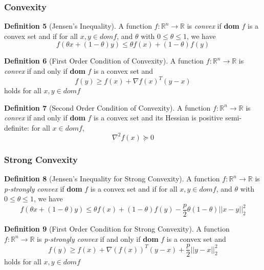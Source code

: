 \subsubsection{Convexity}
\noindent \textbf{Definition 5} (Jensen's Inequality). A function $f: \mathbb{R}^n \rightarrow \mathbb{R}$ is \textit{convex} if \textbf{dom} $f$ is a convex set and if for all $x, y \in dom f$, and $\theta$ with $0 \leq \theta \leq 1$, we have
\begin{equation}
    f(\theta x + (1 - \theta)y) \leq \theta f(x) + (1 - \theta) f(y)
\end{equation}

\noindent \textbf{Definition 6} (First Order Condition of Convexity). A function $f: \mathbb{R}^n \rightarrow \mathbb{R}$ is \textit{convex} if and only if \textbf{dom} $f$ is a convex set and 
\begin{equation}
    f(y) \geq f(x) + \nabla f(x)^T (y - x)
\end{equation}
holds for all $x, y \in dom f$

\noindent \textbf{Definition 7} (Second Order Condition of Convexity). A function $f: \mathbb{R}^n \rightarrow \mathbb{R}$ is \textit{convex} if and only if \textbf{dom} $f$ is a convex set and its Hessian is positive semi-definite: for all $x \in dom f$, 
\begin{equation}
    \nabla^2 f(x) \succeq 0
\end{equation}

\subsubsection{Strong Convexity}
\noindent \textbf{Definition 8} (Jensen's Inequality for Strong Convexity). A function $f: \mathbb{R}^n \rightarrow \mathbb{R}$ is \textit{p-strongly convex} if \textbf{dom} $f$ is a convex set and if for all $x, y \in dom f$, and $\theta$ with $0 \leq \theta \leq 1$, we have
\begin{equation}
    f(\theta x + (1 - \theta) y) \leq \theta f(x) + (1 - \theta) f(y) - \frac{p}{2} \theta (1 - \theta) ||x - y||^2_2
\end{equation}

\noindent \textbf{Definition 9} (First Order Condition for Strong Convexity). A function $f: \mathbb{R}^n \rightarrow \mathbb{R}$ is \textit{p-strongly convex} if and only if \textbf{dom} $f$ is a convex set and 
\begin{equation}
    f(y) \geq f(x) + \nabla(f(x))^T (y - x) + \frac{p}{2} ||y - x||^2_2
\end{equation}
holds for all $x, y \in dom f$

